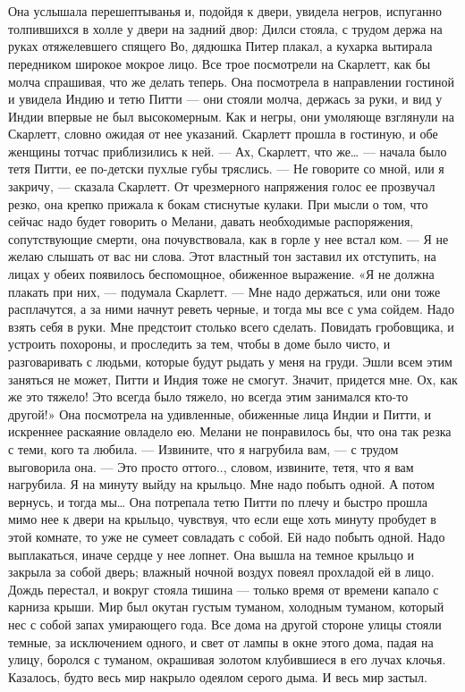 \chapter{\ }

Она услышала перешептыванья и, подойдя к двери, увидела негров, испуганно толпившихся в холле у двери на задний двор:
Дилси стояла, с трудом держа на руках отяжелевшего спящего Во, дядюшка Питер плакал, а кухарка вытирала передником широкое мокрое лицо. Все трое посмотрели на Скарлетт, как бы молча спрашивая, что же делать теперь. Она посмотрела в направлении гостиной и увидела Индию и тетю Питти — они стояли молча, держась за руки, и вид у Индии впервые не был высокомерным. Как и негры, они умоляюще взглянули на Скарлетт, словно ожидая от нее указаний. Скарлетт прошла в гостиную, и обе женщины тотчас приблизились к ней.
— Ах, Скарлетт, что же… — начала было тетя Питти, ее по-детски пухлые губы тряслись.
— Не говорите со мной, или я закричу, — сказала Скарлетт. От чрезмерного напряжения голос ее прозвучал резко, она крепко прижала к бокам стиснутые кулаки. При мысли о том, что сейчас надо будет говорить о Мелани, давать необходимые распоряжения, сопутствующие смерти, она почувствовала, как в горле у нее встал ком. — Я не желаю слышать от вас ни слова.
Этот властный тон заставил их отступить, на лицах у обеих появилось беспомощное, обиженное выражение. «Я не должна плакать при них, — подумала Скарлетт. — Мне надо держаться, или они тоже расплачутся, а за ними начнут реветь черные, и тогда мы все с ума сойдем. Надо взять себя в руки. Мне предстоит столько всего сделать. Повидать гробовщика, и устроить похороны, и проследить за тем, чтобы в доме было чисто, и разговаривать с людьми, которые будут рыдать у меня на груди. Эшли всем этим заняться не может, Питти и Индия тоже не смогут. Значит, придется мне. Ох, как же это тяжело! Это всегда было тяжело, но всегда этим занимался кто-то другой!» Она посмотрела на удивленные, обиженные лица Индии и Питти, и искреннее раскаяние овладело ею. Мелани не понравилось бы, что она так резка с теми, кого та любила.
— Извините, что я нагрубила вам, — с трудом выговорила она. — Это просто оттого.., словом, извините, тетя, что я вам нагрубила. Я на минуту выйду на крыльцо. Мне надо побыть одной. А потом вернусь, и тогда мы…
Она потрепала тетю Питти по плечу и быстро прошла мимо нее к двери на крыльцо, чувствуя, что если еще хоть минуту пробудет в этой комнате, то уже не сумеет совладать с собой. Ей надо побыть одной. Надо выплакаться, иначе сердце у нее лопнет.
Она вышла на темное крыльцо и закрыла за собой дверь; влажный ночной воздух повеял прохладой ей в лицо. Дождь перестал, и вокруг стояла тишина — только время от времени капало с карниза крыши. Мир был окутан густым туманом, холодным туманом, который нес с собой запах умирающего года. Все дома на другой стороне улицы стояли темные, за исключением одного, и свет от лампы в окне этого дома, падая на улицу, боролся с туманом, окрашивая золотом клубившиеся в его лучах клочья. Казалось, будто весь мир накрыло одеялом серого дыма. И весь мир застыл.
